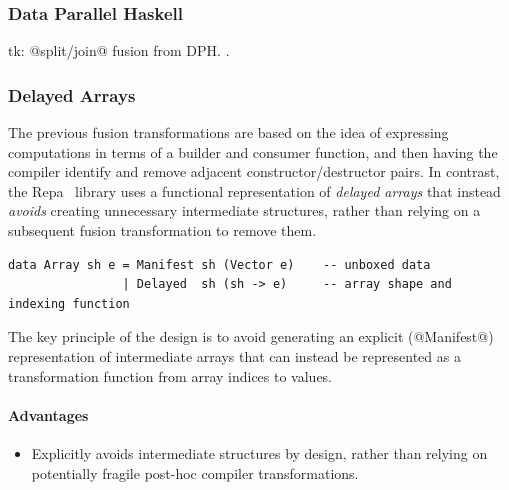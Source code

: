 \subsubsection{Data Parallel Haskell}
tk: @split/join@ fusion from
DPH.
\citet{Chakravarty:2007tc,Jones:2008uu}.


\subsubsection{Delayed Arrays}

The previous fusion transformations are based on the idea of expressing
computations in terms of a builder and consumer function, and then having the
compiler identify and remove adjacent constructor/destructor pairs. In contrast,
the Repa~\cite{Keller:2010er} library uses a functional representation of
\emph{delayed arrays} that instead \emph{avoids}
creating unnecessary intermediate structures, rather than relying on a
subsequent fusion transformation to remove them.

\begin{lstlisting}[style=Haskell,numbers=none,caption={Repa-1 style array definition},label={lst:repa_arrays}]
data Array sh e = Manifest sh (Vector e)    -- unboxed data
                | Delayed  sh (sh -> e)     -- array shape and indexing function
\end{lstlisting}

The key principle of the design is to avoid generating an explicit
(@Manifest@) representation of intermediate arrays that can instead be
represented as a transformation function from array indices to values.


\paragraph{Advantages}
\begin{itemize}
    \item Explicitly avoids intermediate structures by design, rather than
        relying on potentially fragile post-hoc compiler transformations.
\end{itemize}

